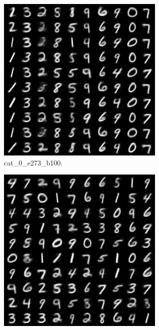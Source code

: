 \begin{figure}[!htbp]
\begin{subfigure}[t]{0.48\textwidth}
   \includegraphics[width=\textwidth,center]{2019-04-24/compare_grad_mode/cat_0_e273_b100.png}
   \caption{cat_0_e273_b100.}
   \label{fig:.._.._notes_journal_figures_2019-04-24_compare_grad_mode-e}
\end{subfigure}
\begin{subfigure}[t]{0.48\textwidth}
   \includegraphics[width=\textwidth,center]{2019-04-24/compare_grad_mode/generated_e273_b100.png}

\end{subfigure}
\end{figure}
